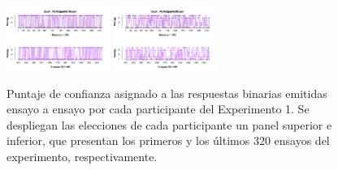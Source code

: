 \documentclass[a4paper ]{article}
\begin{document}
\begin{figure}[th]
\includegraphics[width=0.3\textwidth]{Figures/Rating_Exp1_P19} \includegraphics[width=0.3\textwidth]{Figures/Rating_Exp1_P20} 
\caption[Puntajes de Confianza asignados ensayo a ensayo; Experimento 1]{Puntaje de confianza asignado a las respuestas binarias emitidas ensayo a ensayo por cada participante del Experimento 1. Se despliegan las elecciones de cada participante un panel superior e inferior, que presentan los primeros y los últimos 320 ensayos del experimento, respectivamente.}
\label{fig:Rating_E1}
\end{figure}
\end{document}
